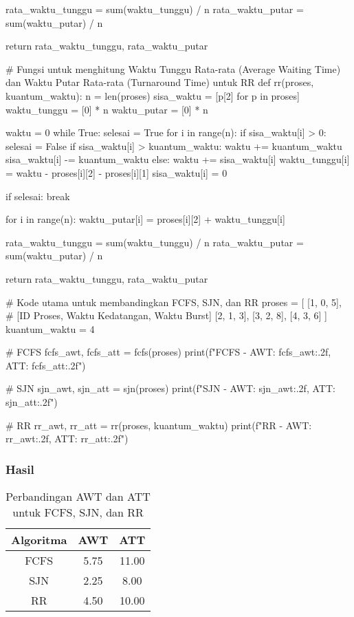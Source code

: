 \documentclass[12pt]{article}
\begin{document}
\begin{python}
    rata_waktu_tunggu = sum(waktu_tunggu) / n
    rata_waktu_putar = sum(waktu_putar) / n

    return rata_waktu_tunggu, rata_waktu_putar

# Fungsi untuk menghitung Waktu Tunggu Rata-rata (Average Waiting Time) dan Waktu Putar Rata-rata (Turnaround Time) untuk RR
def rr(proses, kuantum_waktu):
    n = len(proses)
    sisa_waktu = [p[2] for p in proses]
    waktu_tunggu = [0] * n
    waktu_putar = [0] * n

    waktu = 0
    while True:
        selesai = True
        for i in range(n):
            if sisa_waktu[i] > 0:
                selesai = False
                if sisa_waktu[i] > kuantum_waktu:
                    waktu += kuantum_waktu
                    sisa_waktu[i] -= kuantum_waktu
                else:
                    waktu += sisa_waktu[i]
                    waktu_tunggu[i] = waktu - proses[i][2] - proses[i][1]
                    sisa_waktu[i] = 0

        if selesai:
            break

    for i in range(n):
        waktu_putar[i] = proses[i][2] + waktu_tunggu[i]

    rata_waktu_tunggu = sum(waktu_tunggu) / n
    rata_waktu_putar = sum(waktu_putar) / n

    return rata_waktu_tunggu, rata_waktu_putar

# Kode utama untuk membandingkan FCFS, SJN, dan RR
proses = [
    [1, 0, 5],  # [ID Proses, Waktu Kedatangan, Waktu Burst]
    [2, 1, 3],
    [3, 2, 8],
    [4, 3, 6]
]
kuantum_waktu = 4

# FCFS
fcfs_awt, fcfs_att = fcfs(proses)
print(f"FCFS - AWT: {fcfs_awt:.2f}, ATT: {fcfs_att:.2f}")

# SJN
sjn_awt, sjn_att = sjn(proses)
print(f"SJN - AWT: {sjn_awt:.2f}, ATT: {sjn_att:.2f}")

# RR
rr_awt, rr_att = rr(proses, kuantum_waktu)
print(f"RR - AWT: {rr_awt:.2f}, ATT: {rr_att:.2f}")
\end{python}

\subsubsection{Hasil}

\begin{table}
\centering
\begin{tabular}{|c|c|c|}
\hline
\textbf{Algoritma} & \textbf{AWT} & \textbf{ATT} \\ \hline
FCFS               & 5.75                                & 11.00                                  \\ \hline
SJN                & 2.25                                & 8.00                                  \\ \hline
RR                 & 4.50                                & 10.00                                 \\ \hline
\end{tabular}
\caption{Perbandingan AWT dan ATT untuk FCFS, SJN, dan RR}
\label{tab:comparison}
\end{table}
\end{document}
